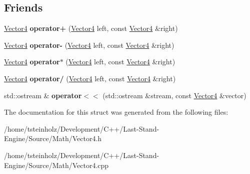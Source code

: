 \subsection*{Friends}
\begin{DoxyCompactItemize}
\item 
\hypertarget{structLastStandEngine_1_1Maths_1_1Vector4_a75cbab3b4b67bfe7a25a81f1c370fb97}{}\hyperlink{structLastStandEngine_1_1Maths_1_1Vector4}{Vector4} {\bfseries operator+} (\hyperlink{structLastStandEngine_1_1Maths_1_1Vector4}{Vector4} left, const \hyperlink{structLastStandEngine_1_1Maths_1_1Vector4}{Vector4} \&right)\label{structLastStandEngine_1_1Maths_1_1Vector4_a75cbab3b4b67bfe7a25a81f1c370fb97}

\item 
\hypertarget{structLastStandEngine_1_1Maths_1_1Vector4_a82d6cb09a990f68ecefb86d8fb7533aa}{}\hyperlink{structLastStandEngine_1_1Maths_1_1Vector4}{Vector4} {\bfseries operator-\/} (\hyperlink{structLastStandEngine_1_1Maths_1_1Vector4}{Vector4} left, const \hyperlink{structLastStandEngine_1_1Maths_1_1Vector4}{Vector4} \&right)\label{structLastStandEngine_1_1Maths_1_1Vector4_a82d6cb09a990f68ecefb86d8fb7533aa}

\item 
\hypertarget{structLastStandEngine_1_1Maths_1_1Vector4_af4b0ad4b9d584ed202ef9d832e010c09}{}\hyperlink{structLastStandEngine_1_1Maths_1_1Vector4}{Vector4} {\bfseries operator$\ast$} (\hyperlink{structLastStandEngine_1_1Maths_1_1Vector4}{Vector4} left, const \hyperlink{structLastStandEngine_1_1Maths_1_1Vector4}{Vector4} \&right)\label{structLastStandEngine_1_1Maths_1_1Vector4_af4b0ad4b9d584ed202ef9d832e010c09}

\item 
\hypertarget{structLastStandEngine_1_1Maths_1_1Vector4_a1b42b0e5a9bf6963e65b9fbc5d2ffddb}{}\hyperlink{structLastStandEngine_1_1Maths_1_1Vector4}{Vector4} {\bfseries operator/} (\hyperlink{structLastStandEngine_1_1Maths_1_1Vector4}{Vector4} left, const \hyperlink{structLastStandEngine_1_1Maths_1_1Vector4}{Vector4} \&right)\label{structLastStandEngine_1_1Maths_1_1Vector4_a1b42b0e5a9bf6963e65b9fbc5d2ffddb}

\item 
\hypertarget{structLastStandEngine_1_1Maths_1_1Vector4_ad30f2c09a88448834310cd8f083db506}{}std\+::ostream \& {\bfseries operator$<$$<$} (std\+::ostream \&stream, const \hyperlink{structLastStandEngine_1_1Maths_1_1Vector4}{Vector4} \&vector)\label{structLastStandEngine_1_1Maths_1_1Vector4_ad30f2c09a88448834310cd8f083db506}

\end{DoxyCompactItemize}


The documentation for this struct was generated from the following files\+:\begin{DoxyCompactItemize}
\item 
/home/tsteinholz/\+Development/\+C++/\+Last-\/\+Stand-\/\+Engine/\+Source/\+Math/Vector4.\+h\item 
/home/tsteinholz/\+Development/\+C++/\+Last-\/\+Stand-\/\+Engine/\+Source/\+Math/Vector4.\+cpp\end{DoxyCompactItemize}
